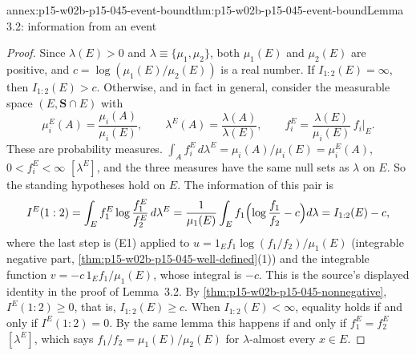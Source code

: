 \begin{annexitem}{annex:p15-w02b-p15-045-event-bound}{thm:p15-w02b-p15-045-event-bound}{Lemma 3.2: information from an event}
\begin{proof}
Since \(\lambda(E)>0\) and \(\lambda\equiv\{\mu_1,\mu_2\}\), both
\(\mu_1(E)\) and \(\mu_2(E)\) are positive, and
\(c=\log(\mu_1(E)/\mu_2(E))\) is a real number. If
\(I_{1:2}(E)=\infty\), then \(I_{1:2}(E)>c\). Otherwise, and in fact
in general, consider the measurable space \((E,\mathbf S\cap E)\) with
\[
  \mu_i^E(A)=\frac{\mu_i(A)}{\mu_i(E)},\qquad
  \lambda^E(A)=\frac{\lambda(A)}{\lambda(E)},\qquad
  f_i^E=\frac{\lambda(E)}{\mu_i(E)}\,f_i\Big|_E .
\]
These are probability measures. \(\int_Af_i^E\,d\lambda^E=\mu_i(A)/\mu_i(E)=\mu_i^E(A)\),
\(0<f_i^E<\infty\) \([\lambda^E]\), and the three measures have the same
null sets as \(\lambda\) on \(E\). So the standing hypotheses hold on
\(E\). The information of this pair is
\[
  I^E(1:2)=\int_Ef_1^E\log\frac{f_1^E}{f_2^E}\,d\lambda^E
          =\frac1{\mu_1(E)}\int_Ef_1\Bigl(\log\frac{f_1}{f_2}-c\Bigr)d\lambda
          =I_{1:2}(E)-c,
\]
where the last step is (E1) applied to \(u=1_Ef_1\log(f_1/f_2)/\mu_1(E)\)
(integrable negative part, \cref{thm:p15-w02b-p15-045-well-defined}(1))
and the integrable function \(v=-c\,1_Ef_1/\mu_1(E)\), whose integral is
\(-c\). This is the source's displayed identity in the proof of
Lemma~3.2. By \cref{thm:p15-w02b-p15-045-nonnegative},
\(I^E(1:2)\geq0\), that is, \(I_{1:2}(E)\geq c\). When
\(I_{1:2}(E)<\infty\), equality holds if and only if \(I^E(1:2)=0\). By
the same lemma this happens if and only if \(f_1^E=f_2^E\)
\([\lambda^E]\), which says \(f_1/f_2=\mu_1(E)/\mu_2(E)\) for
\(\lambda\)-almost every \(x\in E\).
\end{proof}
\end{annexitem}

